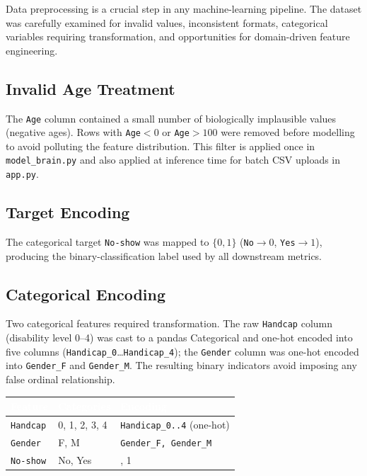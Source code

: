 \documentclass[11pt,a4paper]{article}
\newcommand{\hdrrow}[1]{\textcolor{white}{\textbf{#1}}}
\newcommand{\hdrline}{\rowcolor{navy}}
\begin{document}
Data preprocessing is a crucial step in any machine-learning pipeline. The
dataset was carefully examined for invalid values, inconsistent formats,
categorical variables requiring transformation, and opportunities for
domain-driven feature engineering.

\subsection{Invalid Age Treatment}

The \texttt{Age} column contained a small number of biologically
implausible values (negative ages). Rows with \texttt{Age}$<0$ or
\texttt{Age}$>100$ were removed before modelling to avoid polluting the
feature distribution. This filter is applied once in
\texttt{model\_brain.py} and also applied at inference time for batch CSV
uploads in \texttt{app.py}.

\subsection{Target Encoding}

The categorical target \texttt{No-show} was mapped to $\{0, 1\}$
(\texttt{No}$\to0$, \texttt{Yes}$\to1$), producing the binary-classification
label used by all downstream metrics.

\subsection{Categorical Encoding}

Two categorical features required transformation. The raw \texttt{Handcap}
column (disability level 0--4) was cast to a pandas Categorical and
one-hot encoded into five columns
(\texttt{Handicap\_0}\ldots\texttt{Handicap\_4}); the \texttt{Gender} column
was one-hot encoded into \texttt{Gender\_F} and \texttt{Gender\_M}. The
resulting binary indicators avoid imposing any false ordinal relationship.

\begin{tabularx}{\textwidth}{|>{\hsize=0.3\hsize}X|X|>{\hsize=0.3\hsize}X|}
\hline
\hdrline \hdrrow{Feature} & \hdrrow{Categories} & \hdrrow{Encoding} \\ \hline
\texttt{Handcap}  & 0, 1, 2, 3, 4 & \texttt{Handicap\_0..4} (one-hot)\\ \hline
\texttt{Gender}   & F, M          & \texttt{Gender\_F, Gender\_M} \\ \hline
\texttt{No-show}  & No, Yes       & 0, 1 \\ \hline
\end{tabularx}
\end{document}
